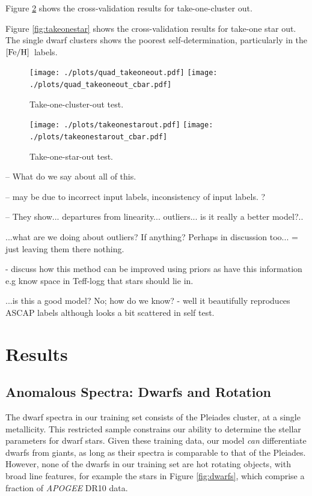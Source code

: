 \documentclass[12pt, preprint]{aastex}
\newcommand{\feh}{\mbox{$\rm [Fe/H]$}}
\begin{document}
Figure \ref{fig:takeoneout} shows the cross-validation results for take-one-cluster out. 

Figure \ref{fig:takeonestar} shows the cross-validation results for take-one star out. The single dwarf clusters shows the poorest self-determination, particularly in the \feh\ labels. 

\begin{figure}[h!]
\centering
  \texttt{[image: ./plots/quad\_takeoneout.pdf]}
    \texttt{[image: ./plots/quad\_takeoneout\_cbar.pdf]}
\caption{Take-one-cluster-out test.}
\label{fig:takeoneout}
\end{figure}

\begin{figure}[h!]
\centering
  \texttt{[image: ./plots/takeonestarout.pdf]}
    \texttt{[image: ./plots/takeonestarout\_cbar.pdf]}
\caption{Take-one-star-out test.}
\label{fig:takeoneout}
\end{figure}

-- What do we say about all of this. 

-- may be due to incorrect input labels, inconsistency of input labels. ?

-- They show... departures from linearity... outliers... is it really a better model?..

...what are we doing about outliers?  If anything?  Perhaps in discussion too... = just leaving them there nothing. 

- discuss how this method can be improved using priors as have this information e.g know space in Teff-logg that stars should lie in. 

...is this a good model?  No; how do we know? - well it beautifully reproduces ASCAP labels although looks a bit scattered in self test.


\section{Results}

\subsection{Anomalous Spectra: Dwarfs and Rotation}

The dwarf spectra in our training set consists of the Pleiades cluster, at a single metallicity. This restricted sample constrains our ability to determine the stellar parameters for dwarf stars. Given these training data, our model \textit{can} differentiate dwarfs from giants, as long as their spectra is comparable to that of the Pleiades. However, none of the dwarfs in our training set are hot rotating objects, with broad line features, for example the stars in Figure \ref{fig:dwarfs}, which comprise a fraction of \textit{APOGEE} DR10 data. 
\end{document}
